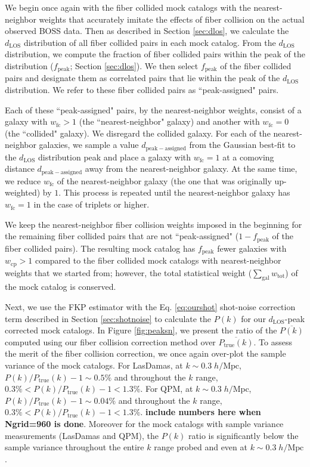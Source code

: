 \documentclass{emulateapj}
\begin{document}
We begin once again with the fiber collided mock catalogs with the nearest-neighbor weights that accurately imitate the effects of fiber collision on the actual observed BOSS data. Then as described in Section \ref{sec:dlos}, we calculate the $d_\mathrm{LOS}$ distribution of all fiber collided pairs in each mock catalog. From the $d_\mathrm{LOS}$ distribution, we compute the fraction of fiber collided pairs within the peak of the distribution ($f_\mathrm{peak}$; Section \ref{sec:dlos}). We then select $f_\mathrm{peak}$ of the fiber collided pairs and designate them as correlated pairs that lie within the peak of the $d_\mathrm{LOS}$ distribution. We refer to these fiber collided pairs as ``peak-assigned" pairs.  

Each of these ``peak-assigned" pairs, by the nearest-neighbor weights, consist of a galaxy with $w_\mathrm{fc} > 1$ (the ``nearest-neighbor" galaxy) and another with $w_\mathrm{fc} = 0$ (the ``collided" galaxy). We disregard the collided galaxy. For each of the nearest-neighbor galaxies, we sample a value $d_\mathrm{peak-assigned}$ from the Gaussian best-fit to the $d_\mathrm{LOS}$ distribution peak and place a galaxy with $w_\mathrm{fc} = 1$ at a comoving distance $d_\mathrm{peak-assigned}$ away from the nearest-neighbor galaxy. At the same time, we reduce $w_\mathrm{fc}$ of the nearest-neighbor galaxy (the one that was originally up-weighted) by $1$. This process is repeated until the nearest-neighbor galaxy has $w_\mathrm{fc} =1$ in the case of triplets or higher. 

We keep the nearest-neighbor fiber collision weights imposed in the beginning for the remaining fiber collided pairs that are not ``peak-assigned" ($1-f_\mathrm{peak}$ of the fiber collided pairs). The resulting mock catalog has $f_\mathrm{peak}$ fewer galaxies with $w_\mathrm{cp} > 1$ compared to the fiber collided mock catalogs with nearest-neighbor weights that we started from; however, the total statistical weight ($\sum_\mathrm{gal} w_\mathrm{tot}$) of the mock catalog is conserved. 

Next, we use the FKP estimator with the Eq. \ref{eq:ourshot} shot-noise correction term described in Section \ref{sec:shotnoise} to calculate the $P(k)$ for our $d_\mathrm{LOS}$-peak corrected mock catalogs. In Figure \ref{fig:peaksn}, we present the ratio of the $\overline{P(k)}$ computed using our fiber collision correction method over $\overline{P_\mathrm{true}(k)}$. To assess the merit of the fiber collision correction, we once again over-plot the sample variance of the mock catalogs. For LasDamas, at $k \sim 0.3 \; h/\mathrm{Mpc}$, $P(k)/P_\mathrm{true}(k) - 1 \sim 0.5 \%$ and throughout the $k$ range, $0.3 \% < P(k)/P_\mathrm{true}(k) - 1 < 1.3 \%$. For QPM, at $k \sim 0.3 \; h/\mathrm{Mpc}$, $P(k)/P_\mathrm{true}(k) - 1 \sim 0.04 \%$ and throughout the $k$ range, $0.3 \% < P(k)/P_\mathrm{true}(k) - 1 < 1.3 \%$. {\bf include numbers here when Ngrid=960 is done}. Moreover for the mock catalogs with sample variance measurements (LasDamas and QPM), the $P(k)$ ratio is significantly below the sample variance throughout the entire $k$ range probed and even at $k\sim 0.3\;h/\mathrm{Mpc}$. 
\end{document}
